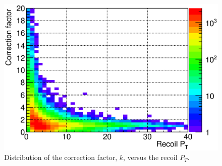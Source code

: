 \documentclass[12pt]{article}
\begin{document}
\begin{figure}[htbp]
\begin{center}
\includegraphics[scale=0.8]{images/plot_PtCorrFactor}
\end{center}
\caption{Distribution of the correction factor, $k$, versus the recoil $P_{T}$.}
\label{fig:plot_PtCorrFactor} 
\end{figure}
\end{document}

